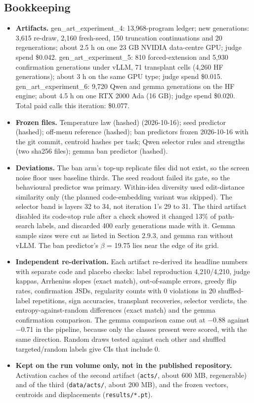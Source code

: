 \documentclass[11pt,letterpaper]{article}
\begin{document}
\subsection{Bookkeeping}
\begin{itemize}
\item \textbf{Artifacts.} gen\_art\_experiment\_4: 13,968-program ledger; new generations: 3,615 re-draw, 2,160 fresh-seed, 150 truncation continuations and 20 regenerations; about 2.5 h on one 23 GB NVIDIA data-centre GPU; judge spend \$0.042. gen\_art\_experiment\_5: 810 forced-extension and 5,930 confirmation generations under vLLM, 71 transplant cells (4,260 HF generations); about 3 h on the same GPU type; judge spend \$0.015. gen\_art\_experiment\_6: 9,720 Qwen and gemma generations on the HF engine; about 4.5 h on one RTX 2000 Ada (16 GB); judge spend \$0.020. Total paid calls this iteration: \$0.077.
\item \textbf{Frozen files.} Temperature law (hashed) (2026-10-16); seed predictor (hashed); off-menu reference (hashed); ban predictors frozen 2026-10-16 with the git commit, centroid hashes per task; Qwen selector rules and strengths (two sha256 files); gemma ban predictor (hashed).
\item \textbf{Deviations.} The ban arm's top-up replicate files did not exist, so the screen noise floor uses baseline thirds. The seed readout failed its gate, so the behavioural predictor was primary. Within-idea diversity used edit-distance similarity only (the planned code-embedding variant was skipped). The selector band is layers 32 to 34, not iteration 1's 29 to 31. The third artifact disabled its code-stop rule after a check showed it changed 13\% of path-search labels, and discarded 400 early generations made with it. Gemma sample sizes were cut as listed in Section 2.9.3, and gemma ran without vLLM. The ban predictor's \ensuremath{\beta} = 19.75 lies near the edge of its grid.
\item \textbf{Independent re-derivation.} Each artifact re-derived its headline numbers with separate code and placebo checks: label reproduction 4,210/4,210, judge kappas, Arrhenius slopes (exact match), out-of-sample errors, greedy flip rates, confirmation JSDs, regularity counts with 0 violations in 20 shuffled-label repetitions, sign accuracies, transplant recoveries, selector verdicts, the entropy-against-random differences (exact match) and the gemma confirmation comparison. The gemma comparison came out at \ensuremath{-}0.88 against \ensuremath{-}0.71 in the pipeline, because only the classes present were scored, with the same direction. Random draws tested against each other and shuffled targeted/random labels give CIs that include 0.
\item \textbf{Kept on the run volume only, not in the published repository.} Activation caches of the second artifact (\texttt{acts/}, about 600 MB, regenerable) and of the third (\texttt{data/acts/}, about 200 MB), and the frozen vectors, centroids and displacements (\texttt{results/*.pt}).
\end{itemize}
\end{document}
